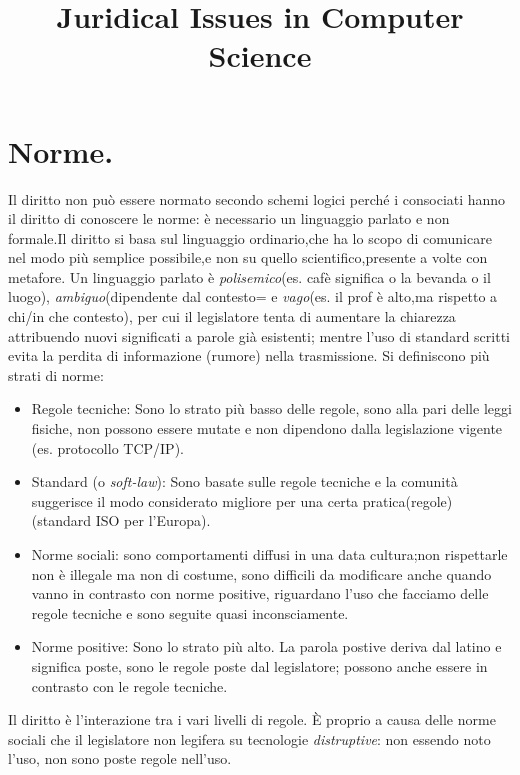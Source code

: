 \documentclass[a4page, 11pt, twocolumn]{article}
\title{Juridical Issues in Computer Science}
\date{}
\begin{document}
\maketitle



\section{Norme.}
Il diritto non può essere normato secondo schemi logici perché i consociati hanno il diritto di conoscere le norme: è necessario un linguaggio parlato e non formale.Il diritto si basa sul linguaggio ordinario,che ha lo scopo di comunicare nel modo più semplice possibile,e non su quello scientifico,presente a volte con metafore.
Un linguaggio parlato è \textit{polisemico}(es. cafè significa o la bevanda o il luogo), \textit{ambiguo}(dipendente dal contesto= e \textit{vago}(es. il prof è alto,ma rispetto a chi/in che contesto), per cui il legislatore tenta di aumentare la chiarezza attribuendo nuovi significati a parole già esistenti; mentre l'uso di standard scritti evita la perdita di informazione (rumore) nella trasmissione. \newline
Si definiscono più strati di norme:
\begin{itemize}
\item Regole tecniche: Sono lo strato più basso delle regole, sono alla pari delle leggi fisiche, non possono essere mutate e non dipendono dalla legislazione vigente (es. protocollo TCP/IP). 
\item Standard (o \textit{soft-law}): Sono basate sulle regole tecniche e la comunità suggerisce il modo considerato migliore per una certa pratica(regole) (standard ISO per l'Europa).
\item Norme sociali: sono comportamenti diffusi in una data cultura;non rispettarle non è illegale ma non di costume, sono difficili da modificare anche quando vanno in contrasto con norme positive, riguardano l'uso che facciamo delle regole tecniche e sono seguite quasi inconsciamente.
\item Norme positive: Sono lo strato più alto. La parola postive deriva dal latino e significa poste, sono le regole poste dal legislatore; possono anche essere in contrasto con le regole tecniche.
\end{itemize}
Il diritto è l'interazione tra i vari livelli di regole. \newline
È proprio a causa delle norme sociali che il legislatore non legifera su tecnologie \textit{distruptive}: non essendo noto l'uso, non sono poste regole nell'uso.
\end{document}
